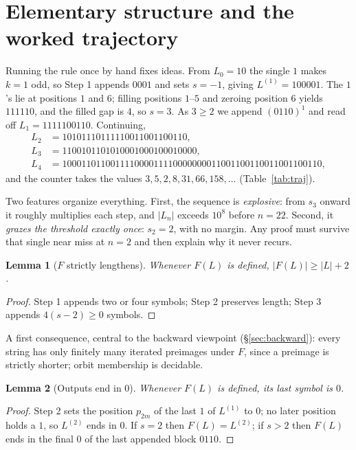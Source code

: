 \documentclass[11pt,reqno]{amsart}
\theoremstyle{plain}
\newtheorem{lemma}{Lemma}
\theoremstyle{definition}
\theoremstyle{remark}
\begin{document}
\section{Elementary structure and the worked trajectory}\label{sec:elem}
Running the rule once by hand fixes ideas. From $L_0=10$ the single $1$ makes $k=1$ odd, so Step 1 appends $0001$ and sets $s=-1$, giving $L^{(1)}=100001$. The $1$'s lie at positions $1$ and $6$; filling positions $1$--$5$ and zeroing position $6$ yields $111110$, and the filled gap is $4$, so $s=3$. As $3\ge 2$ we append $(0110)^1$ and read off $L_1=1111100110$. Continuing,
\begin{align*}
L_2 &= 10101110111110011001100110,\\
L_3 &= 1100101101010001000100010000,\\
L_4 &= 100011011001111000011110000000011001100110011001100110,
\end{align*}
and the counter takes the values $3,5,2,8,31,66,158,\dots$ (Table~\ref{tab:traj}).

Two features organize everything. First, the sequence is \emph{explosive}: from $s_3$ onward it roughly multiplies each step, and $|L_n|$ exceeds $10^8$ before $n=22$. Second, it \emph{grazes the threshold exactly once}: $s_2=2$, with no margin. Any proof must survive that single near miss at $n=2$ and then explain why it never recurs.

\begin{lemma}[$F$ strictly lengthens]\label{lem:length}
Whenever $F(L)$ is defined, $|F(L)|\ge|L|+2$.
\end{lemma}
\begin{proof}
Step 1 appends two or four symbols; Step 2 preserves length; Step 3 appends $4(s-2)\ge 0$ symbols.
\end{proof}

A first consequence, central to the backward viewpoint (\S\ref{sec:backward}): every string has only finitely many iterated preimages under $F$, since a preimage is strictly shorter; orbit membership is decidable.

\begin{lemma}[Outputs end in $0$]\label{lem:end0}
Whenever $F(L)$ is defined, its last symbol is $0$.
\end{lemma}
\begin{proof}
Step 2 sets the position $p_{2m}$ of the last $1$ of $L^{(1)}$ to $0$; no later position holds a $1$, so $L^{(2)}$ ends in $0$. If $s=2$ then $F(L)=L^{(2)}$; if $s>2$ then $F(L)$ ends in the final $0$ of the last appended block $0110$.
\end{proof}
\end{document}

